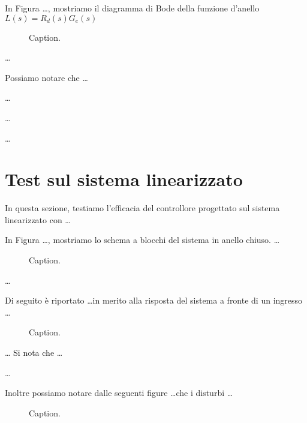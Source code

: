 \documentclass[a4paper, 11pt]{article}
\begin{document}
In Figura \dots, mostriamo il diagramma di Bode della funzione d'anello $L(s) = R_d(s) G_e(s)$

\begin{figure}[h]
    \centering
    \caption{Caption.}
    \label{fig:bode_diagram_L}
\end{figure}

\dots

Possiamo notare che \dots

\dots

\dots

\dots

\section{Test sul sistema linearizzato}

In questa sezione, testiamo l'efficacia del controllore progettato sul sistema linearizzato con \dots

In Figura \dots, mostriamo lo schema a blocchi del sistema in anello chiuso. \dots

\begin{figure}[h]
    \centering
    \caption{Caption.}
    \label{fig:bode_diagram_L}
\end{figure}

\dots

Di seguito è riportato \dots in merito alla risposta del sistema a fronte di un ingresso \dots

\begin{figure}[h]
    \centering
    \caption{Caption.}
    \label{fig:bode_diagram_L}
\end{figure}

\dots
Si nota che \dots

\dots

Inoltre possiamo notare dalle seguenti figure \dots che i disturbi \dots 

\begin{figure}[h]
    \centering
    \caption{Caption.}
    \label{fig:bode_diagram_L}
\end{figure}
\end{document}
